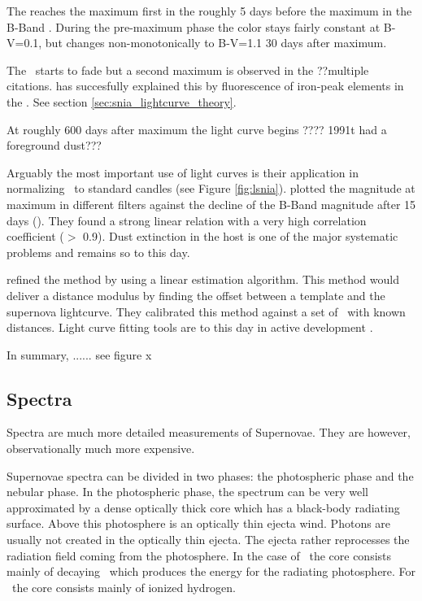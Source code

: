 The \snia reaches the maximum first in the \nir roughly 5 days before the maximum in the B-Band \citep{2000MNRAS.314..782M}. 
During the pre-maximum phase the color stays fairly constant at B-V=0.1, but changes non-monotonically to B-V=1.1 30 days after maximum. 

The \snia\ starts to fade but  a second maximum is observed in the \nir \citep{2008ApJ...689..377W} ??multiple citations.  \citep{2006ApJ...649..939K} has succesfully explained this by fluorescence of iron-peak elements in the \nir. See section \ref{sec:snia_lightcurve_theory}.

At roughly 600 days after maximum the light curve begins ???? 1991t had a foreground dust??? 


Arguably the most important use of light curves is their application in normalizing \sneia\ to standard candles (see Figure \ref{fig:lsnia}). \citet[][]{1993ApJ...413L.105P} plotted the magnitude at maximum in different filters against the decline of the B-Band magnitude after 15 days (\dmb).  They found a strong linear relation with a very high correlation coefficient ($>$ 0.9). Dust extinction in the host is one of the major systematic problems and remains so to this day. 

\cite{1995ApJ...438L..17R} refined the method by using a linear estimation algorithm. This method would deliver a distance modulus by finding the offset between a template and the supernova lightcurve. They calibrated this method against a set of \sneia\ with known distances. 
Light curve fitting tools are to this day in active development \cite[e.g.][]{2007ApJ...659..122J, 2007A&A...466...11G}.

In summary, ...... see figure x


\subsection{Spectra} 

Spectra are much more detailed measurements of Supernovae. They are however, observationally much more expensive. 

Supernovae spectra can be divided in two phases: the photospheric phase and the nebular phase.
In the photospheric phase, the spectrum can be very well approximated by a dense optically thick core which has a black-body radiating surface. Above this photosphere is an  optically thin ejecta wind. Photons are usually not created in the optically thin ejecta. The ejecta rather reprocesses the radiation field coming from the photosphere. 
In the case of \sneia\ the core consists mainly of decaying \Ni\ which produces the energy for the radiating photosphere. For \sneii\ the core consists mainly of ionized hydrogen.

